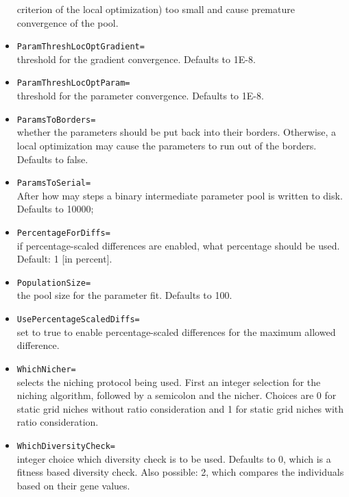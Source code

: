 \documentclass[a4paper,10pt]{scrbook}
\begin{document}
\begin{itemize}
criterion of the local optimization) too small and cause premature convergence
of the pool.
  \item \texttt{ParamThreshLocOptGradient=}\\
	threshold for the gradient convergence. Defaults to 1E-8.
  \item \texttt{ParamThreshLocOptParam=}\\
	threshold for the parameter convergence. Defaults to 1E-8.
  \item \texttt{ParamsToBorders=}\\
	whether the parameters should be put back into their borders. Otherwise,
a local optimization may cause the parameters to run out of the borders.
Defaults to false.
  \item \texttt{ParamsToSerial=}\\
	After how may steps a binary intermediate parameter pool is written to
disk. Defaults to 10000;
  \item \texttt{PercentageForDiffs=}\\
	if percentage-scaled differences are enabled, what percentage should be
	used. Default: 1 [in percent].
  \item \texttt{PopulationSize=}\\
	the pool size for the parameter fit. Defaults to 100.
  \item \texttt{UsePercentageScaledDiffs=}\\
	set to true to enable percentage-scaled differences for the maximum allowed
	difference.
\item \texttt{WhichNicher=}\\
	selects the niching protocol being used. First an integer selection
	for the niching algorithm, followed by a semicolon and the nicher. Choices
	are 0 for static grid niches without ratio consideration and 1 for static
	grid niches with ratio consideration.
  \item \texttt{WhichDiversityCheck=}\\
	integer choice which diversity check is to be used. Defaults to 0, which
is a fitness based diversity check. Also possible: 2, which compares the
individuals based on their gene values.




\end{itemize}
\end{document}
